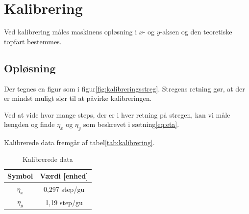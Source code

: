 \chapter{Kalibrering}



Ved kalibrering måles maskinens opløsning i $x$- og $y$-aksen og den
teoretiske topfart bestemmes.

\section{Opløsning}

Der tegnes en figur som i figur\vref{fig:kalibreringsstreg}. Stregens
retning gør, at der er mindst muligt slør til at påvirke
kalibreringen.


Ved at vide hvor mange steps, der er i hver retning på stregen, kan vi
måle længden og finde $\eta_x$ og $\eta_y$ som beskrevet i
sætning\vref{eq:eta}.

Kalibrerede data fremgår af tabel\vref{tab:kalibrering}.

\begin{table}[htbp]
  \centering
  \caption{Kalibrerede data}
  \label{tab:kalibrering}
  \begin{tabular}{cc}
    \toprule
    \bfseries Symbol & \bfseries Værdi [enhed] \\
    \midrule
    $\eta_x$ & 0,297 step/gu \\
    $\eta_y$ & 1,19 step/gu \\
    \bottomrule
  \end{tabular}
\end{table}


